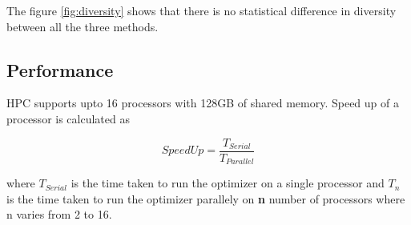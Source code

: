 \documentclass[conference]{IEEEtran}
\begin{document}
	The figure \ref{fig:diversity} shows that there is no statistical difference in diversity between all the three methods.
	
	\subsection{Performance}
	
	HPC supports upto 16 processors with 128GB of shared memory. Speed up of a processor is calculated as
	
	\[SpeedUp = \frac{{T}_{Serial}}{{T}_{Parallel}} \]
	
	where ${T}_{Serial}$ is the time taken to run the optimizer on a single processor and ${T}_{n}$ is the time taken to run the optimizer parallely on \textbf{n} number of processors where n varies from 2 to 16.
	
\end{document}
